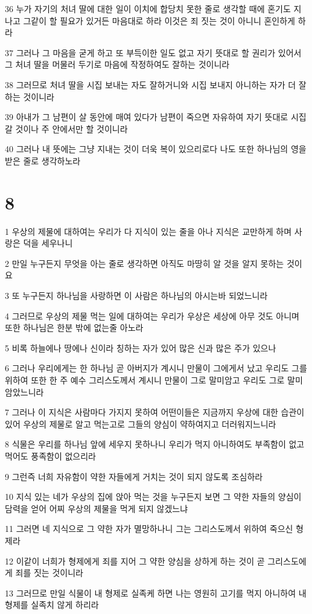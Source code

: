 \par 36 누가 자기의 처녀 딸에 대한 일이 이치에 합당치 못한 줄로 생각할 때에 혼기도 지나고 그같이 할 필요가 있거든 마음대로 하라 이것은 죄 짓는 것이 아니니 혼인하게 하라
\par 37 그러나 그 마음을 굳게 하고 또 부득이한 일도 없고 자기 뜻대로 할 권리가 있어서 그 처녀 딸을 머물러 두기로 마음에 작정하여도 잘하는 것이니라
\par 38 그러므로 처녀 딸을 시집 보내는 자도 잘하거니와 시집 보내지 아니하는 자가 더 잘하는 것이니라
\par 39 아내가 그 남편이 살 동안에 매여 있다가 남편이 죽으면 자유하여 자기 뜻대로 시집 갈 것이나 주 안에서만 할 것이니라
\par 40 그러나 내 뜻에는 그냥 지내는 것이 더욱 복이 있으리로다 나도 또한 하나님의 영을 받은 줄로 생각하노라

\chapter{8}

\par 1 우상의 제물에 대하여는 우리가 다 지식이 있는 줄을 아나 지식은 교만하게 하며 사랑은 덕을 세우나니
\par 2 만일 누구든지 무엇을 아는 줄로 생각하면 아직도 마땅히 알 것을 알지 못하는 것이요
\par 3 또 누구든지 하나님을 사랑하면 이 사람은 하나님의 아시는바 되었느니라
\par 4 그러므로 우상의 제물 먹는 일에 대하여는 우리가 우상은 세상에 아무 것도 아니며 또한 하나님은 한분 밖에 없는줄 아노라
\par 5 비록 하늘에나 땅에나 신이라 칭하는 자가 있어 많은 신과 많은 주가 있으나
\par 6 그러나 우리에게는 한 하나님 곧 아버지가 계시니 만물이 그에게서 났고 우리도 그를 위하여 또한 한 주 예수 그리스도께서 계시니 만물이 그로 말미암고 우리도 그로 말미암았느니라
\par 7 그러나 이 지식은 사람마다 가지지 못하여 어떤이들은 지금까지 우상에 대한 습관이 있어 우상의 제물로 알고 먹는고로 그들의 양심이 약하여지고 더러워지느니라
\par 8 식물은 우리를 하나님 앞에 세우지 못하나니 우리가 먹지 아니하여도 부족함이 없고 먹어도 풍족함이 없으리라
\par 9 그런즉 너희 자유함이 약한 자들에게 거치는 것이 되지 않도록 조심하라
\par 10 지식 있는 네가 우상의 집에 앉아 먹는 것을 누구든지 보면 그 약한 자들의 양심이 담력을 얻어 어찌 우상의 제물을 먹게 되지 않겠느냐
\par 11 그러면 네 지식으로 그 약한 자가 멸망하나니 그는 그리스도께서 위하여 죽으신 형제라
\par 12 이같이 너희가 형제에게 죄를 지어 그 약한 양심을 상하게 하는 것이 곧 그리스도에게 죄를 짓는 것이니라
\par 13 그러므로 만일 식물이 내 형제로 실족케 하면 나는 영원히 고기를 먹지 아니하여 내 형제를 실족치 않게 하리라

